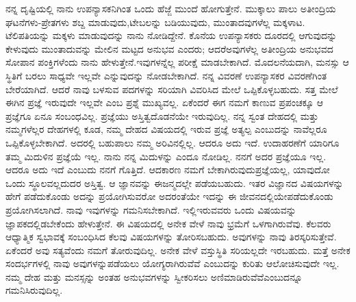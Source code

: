 ನನ್ನ ದೃಷ್ಟಿಯಲ್ಲಿ ನಾನು ಉಪನ್ಯಾಸಕನಿಗಿಂತ ಒಂದು ಹೆಜ್ಜೆ ಮುಂದೆ ಹೋಗುತ್ತೇನೆ. ಮುಕ್ಕಾಲು ಪಾಲು ಅತೀಂದ್ರಿಯ ಘಟನೆಗಳು-ಪ್ರೇತಗಳು ಶಬ್ದ ಮಾಡುವುದು,\break ಟೇಬಲನ್ನು ಬಡಿಯುವುದು, ಮುಂತಾದವುಗಳೆಲ್ಲ ಮಕ್ಕಳಾಟ. ಟೆಲಿಪತಿಯನ್ನು ಮಕ್ಕಳು ಮಾಡುವುದನ್ನು ನಾನು ನೋಡಿದ್ದೇನೆ. ಕೊನೆಯ ಉಪನ್ಯಾಸಕರು ದೂರದಲ್ಲಿ ಆಗುವುದನ್ನು ಕೇಳುವುದು ಮುಂತಾದುವನ್ನು ಮೇಲಿನ ಮಟ್ಟದ ಅನುಭವ ಎಂದರು; ಆದರೆ\break ಅವುಗಳೆಲ್ಲ ಅತೀಂದ್ರಿಯ ಅನುಭವದ ಸೋಪಾನ ಪಂಕ್ತಿಗಳೆಂದು ನಾನು ಹೇಳುತ್ತೇನೆ.\break ಇವುಗಳನ್ನೆಲ್ಲ ಪರೀಕ್ಷೆ ಮಾಡಬೇಕಾಗಿದೆ. ಮೊದಲನೆಯದಾಗಿ, ಮನಸ್ಸು ಆ ಸ್ಥಿತಿಗೆ ಬರಲು ಸಾಧ್ಯವೇ ಇಲ್ಲವೇ ಎನ್ನುವುದನ್ನು ನೋಡಬೇಕಾಗಿದೆ. ನನ್ನ ವಿವರಣೆ ಉಪನ್ಯಾಸಕರ ವಿವರಣೆಗಿಂತ ಬೇರೆಯಾಗಿದೆ. ಆದರೆ ನಾವು ಬಳಸುವ ಪದಗಳನ್ನು ಸರಿಯಾಗಿ ವಿವರಿಸಿದ ಮೇಲೆ ಒಪ್ಪಿಕೊಳ್ಳಬಹುದು. ಸತ್ತ ಮೇಲೆ ಈಗಿನ ಪ್ರಜ್ಞೆ ಇರುವುದೇ ಇಲ್ಲವೇ ಎಂಬ ಪ್ರಶ್ನೆ ಮುಖ್ಯವಲ್ಲ. ಏಕೆಂದರೆ ಈಗ ನಮಗೆ ಕಾಣುವ ಪ್ರಪಂಚಕ್ಕೂ ಆ ಪ್ರಜ್ಞೆಗೂ ಏನೂ ಸಂಬಂಧವಿಲ್ಲ. ಪ್ರಜ್ಞೆಯು ಅಸ್ತಿತ್ವದೊಡನೆಯೇ ಇರುವುದಿಲ್ಲ. ನನ್ನ ಸ್ವಂತ ದೇಹದಲ್ಲಿ ಮತ್ತು ನಮ್ಮಗಳೆಲ್ಲರ ದೇಹಗಳಲ್ಲಿ ಕೂಡ, ನಮ್ಮ ದೇಹದ ವಿಷಯದಲ್ಲಿ ಇರುವ ಪ್ರಜ್ಞೆ ಅತ್ಯಲ್ಪ ಎಂಬುದನ್ನು ನಾವೆಲ್ಲರೂ ಒಪ್ಪಿಕೊಳ್ಳಬೇಕಾಗಿದೆ. ಅದರಲ್ಲಿ ಬಹುಪಾಲು ನಮ್ಮ ಅರಿವಿನಲ್ಲಿಲ್ಲ. ಆದರೂ ಅದು ಇದೆ. ಉದಾಹರಣೆಗೆ ಯಾರಿಗೂ ತಮ್ಮ ಮಿದುಳಿನ ಪ್ರಜ್ಞೆಯೆ ಇಲ್ಲ. ನಾನು ನನ್ನ ಮಿದುಳನ್ನು ಎಂದೂ ನೋಡಿಲ್ಲ. ನನಗೆ ಅದರ ಪ್ರಜ್ಞೆಯೂ ಇಲ್ಲ. ಆದರೂ ಅದು ಇದೆ ಎಂಬುದು ನನಗೆ ಗೊತ್ತಿದೆ. ಆದಕಾರಣ ನಮಗೆ ಬೇಕಾಗಿರುವುದು\break ಪ್ರಜ್ಞೆಯಲ್ಲ, ಯಾವುದೋ ಒಂದು ಸ್ಥೂಲವಲ್ಲದುದರ ಅಸ್ತಿತ್ವ. ಆ ಜ್ಞಾನವನ್ನು ಈ\break ಜನ್ಮದಲ್ಲೇ ಪಡೆಯಬಹುದು. ಇತರ ವಿಜ್ಞಾನದ ವಿಷಯಗಳನ್ನು ಹೇಗೆ ಪಡೆದುಕೊಂಡು ಅದನ್ನು ಪ್ರಯೋಗಿಸುವರೋ ಅದರಂತೆಯೇ ಇದನ್ನು ಈ ಜೀವನದಲ್ಲಿಯೇ\break ಪಡೆದುಕೊಂಡು ಪ್ರಯೋಗಿಸಲಾಗಿದೆ. ನಾವು ಇವುಗಳನ್ನು ಗಮನಿಸಬೇಕಾಗಿದೆ. ಇಲ್ಲಿ\break ಇರುವವರು ಒಂದು ವಿಷಯವನ್ನು ಜ್ಞಾಪಕದಲ್ಲಿಡಬೇಕೆಂದು ಹೇಳುತ್ತೇನೆ. ಈ ವಿಷಯದಲ್ಲಿ ಅನೇಕ ವೇಳೆ ನಾವು ಭ್ರಮೆಗೆ ಒಳಗಾಗಿರುವೆವು. ಕೆಲವರು ಆಧ್ಯಾತ್ಮಿಕ ಸ್ವಭಾವಕ್ಕೆ ಸಂಬಂಧಿಸಿದ ಕೆಲವು ವಿಷಯಗಳನ್ನು ತೋರಿಸಬಹುದು. ಅವುಗಳನ್ನು ನಾವು ತಿರಸ್ಕರಿಸುತ್ತೇವೆ. ಏಕೆಂದರೆ ಅವು ಸತ್ಯವೆಂದು ನಮಗೆ ತೋರುವುದಿಲ್ಲ. ಅನೇಕ ವೇಳೆ ವಸ್ತುಸ್ಥಿತಿ ಸರಿಯಲ್ಲದೇ ಇರಬಹುದು. ಮತ್ತೆ ಅನೇಕ ಸಂದರ್ಭಗಳಲ್ಲಿ ನಾವು ಅವುಗಳನ್ನು\break ಪಡೆಯಲು ಯೋಗ್ಯರಾಗಿರುವೆವೆ ಎಂಬುದನ್ನು ಕುರಿತು ಆಲೋಚಿಸುವುದೇ ಇಲ್ಲ. ನಮ್ಮ ದೇಹ ಮತ್ತು ಮನಸ್ಸನ್ನು ಅಂತಹ ಅನುಭವಗಳನ್ನು ಸ್ವೀಕರಿಸಲು ಅಣಿಮಾಡಿರುವೆವೆ\break ಎಂಬುದನ್ನೂ ಗಮನಿಸಿರುವುದಿಲ್ಲ.

